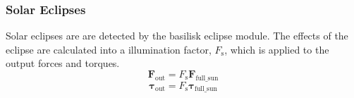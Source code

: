 \subsubsection{Solar Eclipses}
Solar eclipses are are detected by the basilisk eclipse module. The effects of the eclipse are calculated into a illumination factor, $F_{\mathrm{s}}$, which is applied to the output forces and torques.
\begin{equation}
\mathbf{F}_{\mathrm{out}} = F_{\mathrm{s}}\mathbf{F}_{\mathrm{full\_sun}}
\end{equation}
\begin{equation}
\bm{\tau}_{\mathrm{out}} = F_{\mathrm{s}}\bm{\tau}_{\mathrm{full\_sun}}
\end{equation}
